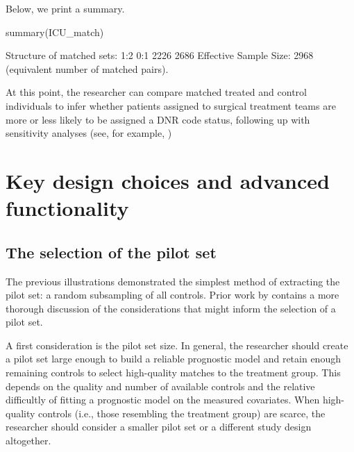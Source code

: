 Below, we print a summary.

\begin{example}
summary(ICU_match) 
\end{example}

\begin{example}
Structure of matched sets:
 1:2  0:1 
2226 2686 
Effective Sample Size:  2968 
(equivalent number of matched pairs).
\end{example}

At this point, the researcher can compare matched treated and control individuals to infer whether patients assigned to surgical treatment teams are more or less likely to be assigned a DNR code status, following up with sensitivity analyses (see, for example,  \citep{rosenbaum2014senmw})


\section{Key design choices and advanced functionality}\label{sec:key_design_choices}

\subsection{The selection of the pilot set}\label{subsec:pilot_sampling}

The previous illustrations demonstrated the simplest method of extracting the pilot set: a random subsampling of all controls.  Prior work by \citet{aikens2020pilot} contains a more thorough discussion of the considerations that might inform the selection of a pilot set.

A first consideration is the pilot set size.  In general, the researcher should create a pilot set large enough to build  a reliable prognostic model and retain enough remaining controls to select high-quality matches to the treatment group.  This  depends on the quality and number of available controls and the relative difficultly of fitting a prognostic model on the measured covariates. When high-quality controls (i.e., those resembling the treatment group) are scarce, the researcher should consider a smaller pilot set or a different study design altogether.

